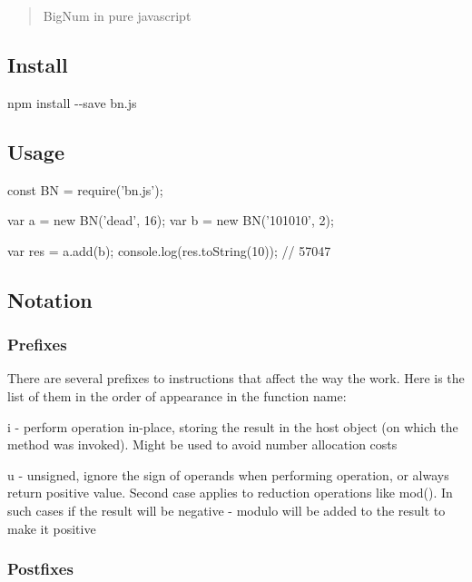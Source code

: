 \begin{quote}
Big\+Num in pure javascript \end{quote}


\href{http://travis-ci.org/indutny/bn.js}{\tt }

\subsection*{Install}

{\ttfamily npm install -\/-\/save bn.\+js}

\subsection*{Usage}


\begin{DoxyCode}
const BN = require('bn.js');

var a = new BN('dead', 16);
var b = new BN('101010', 2);

var res = a.add(b);
console.log(res.toString(10));  // 57047
\end{DoxyCode}


\subsection*{Notation}

\subsubsection*{Prefixes}

There are several prefixes to instructions that affect the way the work. Here is the list of them in the order of appearance in the function name\+:


\begin{DoxyItemize}
\item {\ttfamily i} -\/ perform operation in-\/place, storing the result in the host object (on which the method was invoked). Might be used to avoid number allocation costs
\item {\ttfamily u} -\/ unsigned, ignore the sign of operands when performing operation, or always return positive value. Second case applies to reduction operations like {\ttfamily mod()}. In such cases if the result will be negative -\/ modulo will be added to the result to make it positive
\end{DoxyItemize}

\subsubsection*{Postfixes}

